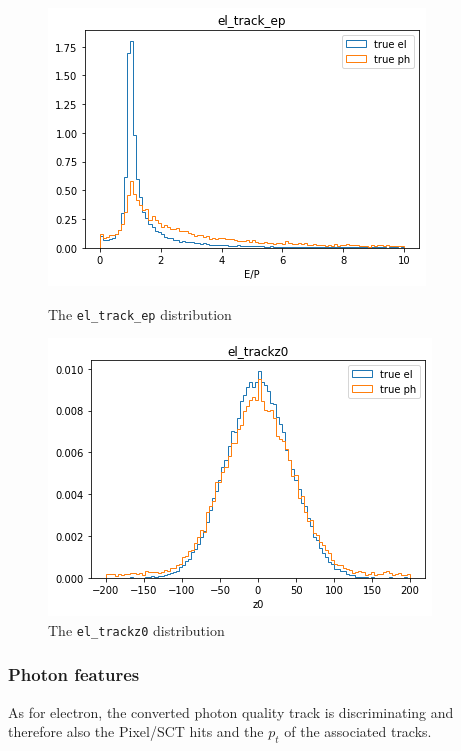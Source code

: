 \documentclass[a4paper, oneside, 11pt, openright]{book}
\begin{document}
					\begin{figure}[h!]  
						\begin{minipage}[b]{0.5\linewidth}
							\centering
							\includegraphics[width=.9\linewidth]{tesi_images/el_track_ep.png} 
							\caption{The \texttt{el\_track\_ep} distribution} 
							\label{fig: ep}
							\vspace{4ex}
						\end{minipage}%
						\begin{minipage}[b]{0.5\linewidth}
							\centering
							\includegraphics[width=.9\linewidth]{tesi_images/el_trackz0.png} 
							\caption{The \texttt{el\_trackz0} distribution}
							\label{fig: z0} 
							\vspace{4ex}
						\end{minipage} 
					\end{figure}
				
				
				\subsubsection{Photon features}
					As for electron, the converted photon quality track is discriminating and therefore also the Pixel/SCT hits and the $p_t$ of the associated tracks.
					
\end{document}

